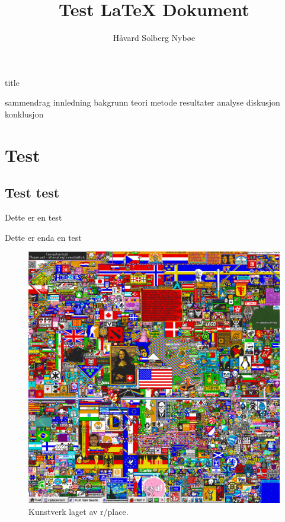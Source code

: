 \documentclass[a4paper, 12pt]{article}
\title{Test {\LaTeX} Dokument}
\author{Håvard Solberg Nybøe}
\begin{document}

{title}
\newpage

\tableofcontents
\listoffigures
\listoftables
\newpage


{sammendrag}
{innledning}
{bakgrunn}
{teori}
{metode}
{resultater}
{analyse}
{diskusjon}
{konklusjon}

\section{Test}
\subsection{Test test}
Dette er en test

Dette er enda en test
    
    \begin{figure}[h]\label{r/place}
        \centering
        \includegraphics[width=.6\textwidth]{img/r_place.png}
        \caption{Kunstverk laget av r/place.}
    \end{figure}
    
    \newpage

\printbibliography[heading=bibintoc]
    
\end{document}
